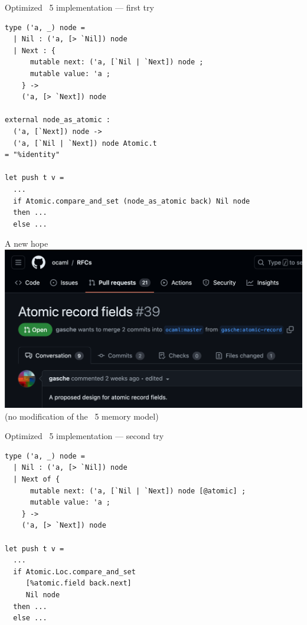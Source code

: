 
\begin{frame}[fragile]{Optimized \OCaml~5 implementation --- first try}
\small
\begin{verbatim}
type ('a, _) node =
  | Nil : ('a, [> `Nil]) node
  | Next : {
      mutable next: ('a, [`Nil | `Next]) node ;
      mutable value: 'a ;
    } -> 
    ('a, [> `Next]) node

external node_as_atomic :
  ('a, [`Next]) node ->
  ('a, [`Nil | `Next]) node Atomic.t
= "%identity"

let push t v =
  ...
  if Atomic.compare_and_set (node_as_atomic back) Nil node
  then ...
  else ...
\end{verbatim}
\end{frame}


\begin{frame}{A new hope}
\centering
\includegraphics[scale=0.35]{images/rfc.png}
\vfill
(no modification of the \OCaml~5 memory model)
\end{frame}


\begin{frame}[fragile]{Optimized \OCaml~5 implementation --- second try}
\begin{verbatim}
type ('a, _) node =
  | Nil : ('a, [> `Nil]) node
  | Next of {
      mutable next: ('a, [`Nil | `Next]) node [@atomic] ;
      mutable value: 'a ;
    } -> 
    ('a, [> `Next]) node

let push t v =
  ...
  if Atomic.Loc.compare_and_set
     [%atomic.field back.next]
     Nil node
  then ...
  else ...
\end{verbatim}
\end{frame}

